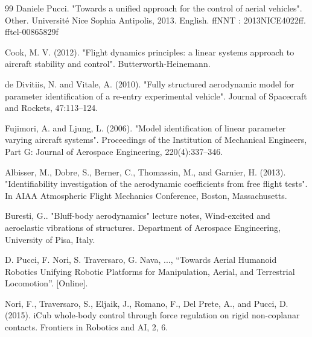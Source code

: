 \begin{thebibliography}{99}
 Daniele Pucci. "Towards a unified approach for the control of aerial vehicles". Other. Université Nice Sophia Antipolis, 2013. English. ffNNT : 2013NICE4022ff. fftel-00865829f

 Cook, M. V. (2012). "Flight dynamics principles: a linear systems approach to aircraft stability and control". Butterworth-Heinemann.

 de Divitiis, N. and Vitale, A. (2010). "Fully structured aerodynamic model for parameter identification of a re-entry experimental vehicle". Journal of Spacecraft and Rockets, 47:113–124.

 Fujimori, A. and Ljung, L. (2006). "Model identification of linear parameter varying aircraft systems". Proceedings of the Institution of Mechanical Engineers, Part G: Journal of Aerospace Engineering, 220(4):337–346.

 Albisser, M., Dobre, S., Berner, C., Thomassin, M., and Garnier, H. (2013). "Identifiability investigation of the aerodynamic coefficients from free flight tests". In AIAA Atmospheric Flight
Mechanics Conference, Boston, Massachusetts.

 Buresti, G.. "Bluff-body aerodynamics" lecture notes, Wind-excited and aeroelastic vibrations of structures. Department of Aerospace Engineering, University of Pisa, Italy.

  D. Pucci, F. Nori, S. Traversaro, G. Nava, ..., “Towards Aerial Humanoid Robotics Unifying Robotic Platforms for Manipulation, Aerial, and Terrestrial Locomotion”. [Online]. 

 Nori, F., Traversaro, S., Eljaik, J., Romano, F., Del Prete, A., and Pucci, D. (2015). iCub whole-body control through force regulation on rigid non-coplanar contacts. Frontiers in Robotics and AI, 2, 6.

\end{thebibliography}